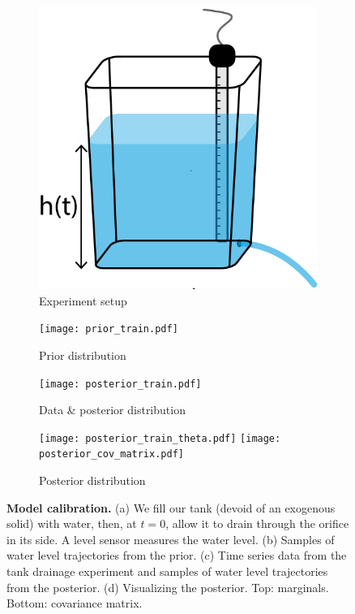 \documentclass[openacc]{rsproca_new}%
\begin{document}
\begin{figure}[!ht]
    \centering
        \begin{subfigure}[b]{0.225\textwidth}
    	\includegraphics[width=\textwidth]{naked_tank.pdf}
	\caption{Experiment setup} \label{fig:naked_tank}
    \end{subfigure}
    
     \begin{subfigure}[b]{0.4\textwidth}
    	\texttt{[image: prior\_train.pdf]}
	\caption{Prior distribution} \label{fig:prior_train}
    \end{subfigure}
     \begin{subfigure}[b]{0.4\textwidth}
    	\texttt{[image: posterior\_train.pdf]}
	\caption{Data \& posterior distribution} \label{fig:posterior_train}
    \end{subfigure}
    
     \begin{subfigure}[b]{\textwidth}
     \center
    	\texttt{[image: posterior\_train\_theta.pdf]}
	\texttt{[image: posterior\_cov\_matrix.pdf]}
	\caption{Posterior distribution} \label{fig:posterior_train_theta}
    \end{subfigure}
    \caption{
      \textbf{Model calibration.}
      (a) We fill our tank (devoid of an exogenous solid) with water, then, at $t=0$, allow it to drain through the orifice in its side. A level sensor measures the water level.     
      (b) Samples of water level trajectories from the prior.
      (c) Time series data from the tank drainage experiment and samples of water level trajectories from the posterior.
       (d) Visualizing the posterior. Top: marginals. Bottom: covariance matrix.      
      }
\end{figure}
\end{document}
